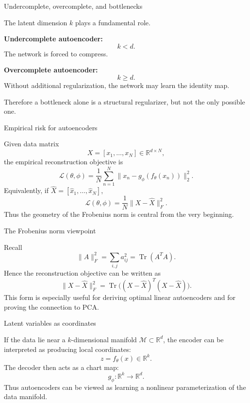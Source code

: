\documentclass[aspectratio=169]{beamer}
\begin{document}
\begin{frame}{Undercomplete, overcomplete, and bottlenecks}

The latent dimension \(k\) plays a fundamental role.

\textbf{Undercomplete autoencoder:}
\[
k<d.
\]
The network is forced to compress.

\textbf{Overcomplete autoencoder:}
\[
k\ge d.
\]
Without additional regularization, the network may learn the identity map.

Therefore a bottleneck alone is a structural regularizer, but not the only possible one.

\end{frame}

\begin{frame}{Empirical risk for autoencoders}

Given data matrix
\[
X = [x_1,\dots,x_N] \in \mathbb{R}^{d\times N},
\]
the empirical reconstruction objective is
\[
\mathcal{L}(\theta,\phi)
=
\frac{1}{N}\sum_{n=1}^N \|x_n-g_\phi(f_\theta(x_n))\|_2^2.
\]
Equivalently, if \(\hat X=[\hat x_1,\dots,\hat x_N]\),
\[
\mathcal{L}(\theta,\phi)=\frac{1}{N}\|X-\hat X\|_F^2.
\]
Thus the geometry of the Frobenius norm is central from the very beginning.

\end{frame}

\begin{frame}{The Frobenius norm viewpoint}

Recall
\[
\|A\|_F^2 = \sum_{i,j} a_{ij}^2 = \operatorname{Tr}(A^T A).
\]
Hence the reconstruction objective can be written as
\[
\|X-\hat X\|_F^2
=
\operatorname{Tr}\bigl((X-\hat X)^T(X-\hat X)\bigr).
\]
This form is especially useful for deriving optimal linear autoencoders and for proving the connection to PCA.

\end{frame}

\begin{frame}{Latent variables as coordinates}

If the data lie near a \(k\)-dimensional manifold \(\mathcal{M}\subset\mathbb{R}^d\), the encoder can be interpreted as producing local coordinates:
\[
z=f_\theta(x)\in \mathbb{R}^k.
\]
The decoder then acts as a chart map:
\[
g_\phi: \mathbb{R}^k \to \mathbb{R}^d.
\]
Thus autoencoders can be viewed as learning a nonlinear parameterization of the data manifold.

\end{frame}
\end{document}
